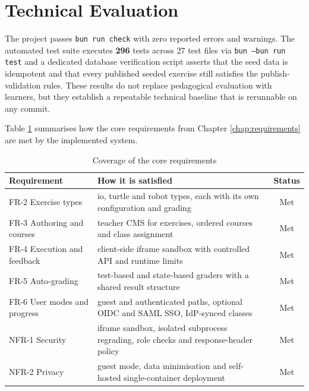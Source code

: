 \section{Technical Evaluation}
\label{sec:technical-evaluation}
The project passes \texttt{bun run check} with zero reported errors and warnings.
The automated test suite executes \textbf{296} tests across 27 test files via \texttt{bun --bun run test} 
and a dedicated database verification script asserts that the seed data is idempotent and that every published seeded 
exercise still satisfies the publish-validation rules. These results do not replace pedagogical evaluation with learners, 
but they establish a repeatable technical baseline that is rerunnable on any commit.

Table \ref{tab:eval-requirements} summarises how the core requirements from
Chapter \ref{chap:requirements} are met by the implemented system.

\begin{table}[H]
  \centering
  \footnotesize
  \caption{Coverage of the core requirements}
  \label{tab:eval-requirements}
  \begin{tabularx}{\textwidth}{|l|X|c|}
    \hline
    \textbf{Requirement}            & \textbf{How it is satisfied}                                                              & \textbf{Status} \\\hline
    FR-2 Exercise types             & io, turtle and robot types, each with its own configuration and grading                & Met             \\\hline
    FR-3 Authoring and courses      & teacher CMS for exercises, ordered courses and class assignment                           & Met             \\\hline
    FR-4 Execution and feedback     & client-side iframe sandbox with controlled API and runtime limits                         & Met             \\\hline
    FR-5 Auto-grading               & test-based and state-based graders with a shared result structure                         & Met             \\\hline
    FR-6 User modes and progress    & guest and authenticated paths, optional OIDC and SAML SSO, IdP-synced classes             & Met             \\\hline
    NFR-1 Security                  & iframe sandbox, isolated subprocess regrading, role checks and response-header policy     & Met             \\\hline
    NFR-2 Privacy                   & guest mode, data minimisation and self-hosted single-container deployment                 & Met             \\\hline
  \end{tabularx}
\end{table}

